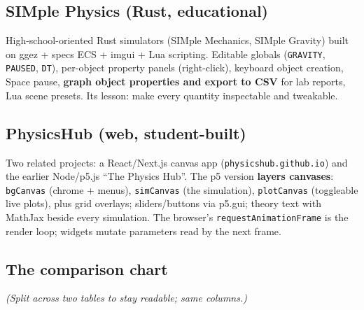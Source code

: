 \documentclass[11pt]{article}
\newcommand{\code}[1]{\texttt{#1}}
\begin{document}
\subsection{SIMple Physics (Rust, educational)}

High-school-oriented Rust simulators (SIMple Mechanics, SIMple
Gravity) built on ggez + specs ECS + imgui + Lua scripting. Editable
globals (\code{GRAVITY}, \code{PAUSED}, \code{DT}), per-object
property panels (right-click), keyboard object creation, Space pause,
\textbf{graph object properties and export to CSV} for lab reports,
Lua scene presets. Its lesson: make every quantity inspectable and
tweakable.

\subsection{PhysicsHub (web, student-built)}

Two related projects: a React/Next.js canvas app
(\code{physicshub.github.io}) and the earlier Node/p5.js ``The
Physics Hub''. The p5 version \textbf{layers canvases}:
\code{bgCanvas} (chrome + menus), \code{simCanvas} (the simulation),
\code{plotCanvas} (toggleable live plots), plus grid overlays;
sliders/buttons via p5.gui; theory text with MathJax beside every
simulation. The browser's \code{requestAnimationFrame} is the render
loop; widgets mutate parameters read by the next frame.

\subsection{The comparison chart}

\emph{(Split across two tables to stay readable; same columns.)}
\end{document}
